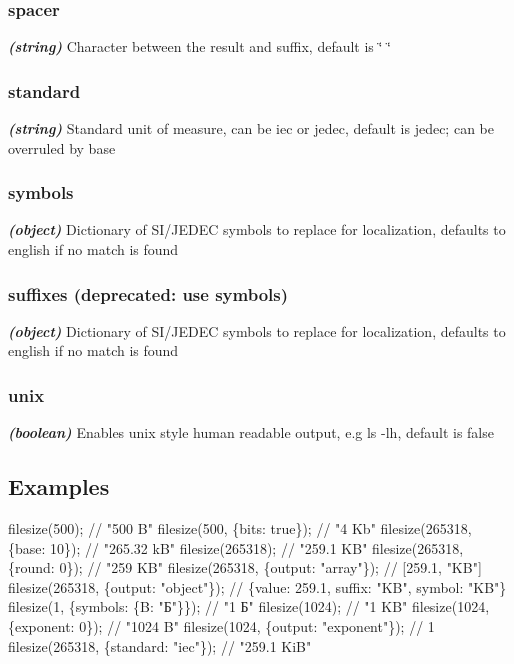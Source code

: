 \subsubsection*{spacer}

{\itshape {\itshape {\bfseries (string)}}} Character between the {\ttfamily result} and {\ttfamily suffix}, default is {\ttfamily \char`\"{} \char`\"{}}

\subsubsection*{standard}

{\itshape {\itshape {\bfseries (string)}}} Standard unit of measure, can be {\ttfamily iec} or {\ttfamily jedec}, default is {\ttfamily jedec}; can be overruled by {\ttfamily base}

\subsubsection*{symbols}

{\itshape {\itshape {\bfseries (object)}}} Dictionary of S\+I/\+J\+E\+D\+EC symbols to replace for localization, defaults to english if no match is found

\subsubsection*{suffixes (deprecated\+: use \textquotesingle{}symbols\textquotesingle{})}

{\itshape {\itshape {\bfseries (object)}}} Dictionary of S\+I/\+J\+E\+D\+EC symbols to replace for localization, defaults to english if no match is found

\subsubsection*{unix}

{\itshape {\itshape {\bfseries (boolean)}}} Enables unix style human readable output, e.\+g {\ttfamily ls -\/lh}, default is {\ttfamily false}

\subsection*{Examples}


\begin{DoxyCode}
filesize(500);                        // "500 B"
filesize(500, \{bits: true\});          // "4 Kb"
filesize(265318, \{base: 10\});         // "265.32 kB"
filesize(265318);                     // "259.1 KB"
filesize(265318, \{round: 0\});         // "259 KB"
filesize(265318, \{output: "array"\});  // [259.1, "KB"]
filesize(265318, \{output: "object"\}); // \{value: 259.1, suffix: "KB", symbol: "KB"\}
filesize(1, \{symbols: \{B: "Б"\}\});    // "1 Б"
filesize(1024);                       // "1 KB"
filesize(1024, \{exponent: 0\});        // "1024 B"
filesize(1024, \{output: "exponent"\}); // 1
filesize(265318, \{standard: "iec"\});  // "259.1 KiB"
\end{DoxyCode}


